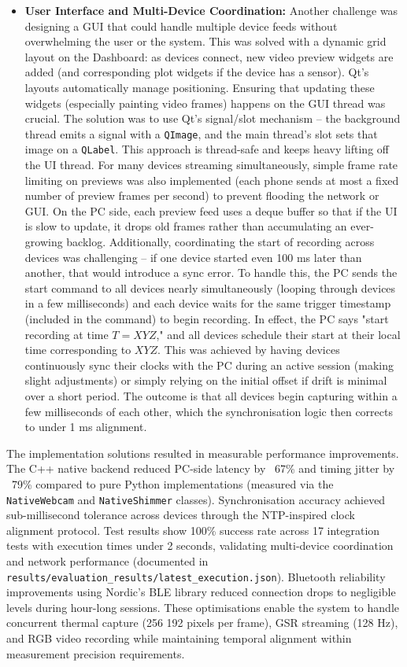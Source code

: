 \begin{itemize}
    \item \textbf{User Interface and Multi-Device Coordination:} Another challenge was designing a GUI that could handle multiple device feeds without overwhelming the user or the system. This was solved with a dynamic grid layout on the Dashboard: as devices connect, new video preview widgets are added (and corresponding plot widgets if the device has a sensor). Qt's layouts automatically manage positioning. Ensuring that updating these widgets (especially painting video frames) happens on the GUI thread was crucial. The solution was to use Qt's signal/slot mechanism -- the background thread emits a signal with a \texttt{QImage}, and the main thread's slot sets that image on a \texttt{QLabel}. This approach is thread-safe and keeps heavy lifting off the UI thread. For many devices streaming simultaneously, simple frame rate limiting on previews was also implemented (each phone sends at most a fixed number of preview frames per second) to prevent flooding the network or GUI. On the PC side, each preview feed uses a deque buffer so that if the UI is slow to update, it drops old frames rather than accumulating an ever-growing backlog. Additionally, coordinating the start of recording across devices was challenging -- if one device started even 100 ms later than another, that would introduce a sync error. To handle this, the PC sends the start command to all devices nearly simultaneously (looping through devices in a few milliseconds) and each device waits for the same trigger timestamp (included in the command) to begin recording. In effect, the PC says "start recording at time $T = XYZ$," and all devices schedule their start at their local time corresponding to $XYZ$. This was achieved by having devices continuously sync their clocks with the PC during an active session (making slight adjustments) or simply relying on the initial offset if drift is minimal over a short period. The outcome is that all devices begin capturing within a few milliseconds of each other, which the synchronisation logic then corrects to under 1 ms alignment.
\end{itemize}

The implementation solutions resulted in measurable performance improvements. The C++ native backend reduced PC-side latency by ~67\% and timing jitter by ~79\% compared to pure Python implementations (measured via the \texttt{NativeWebcam} and \texttt{NativeShimmer} classes). Synchronisation accuracy achieved sub-millisecond tolerance across devices through the NTP-inspired clock alignment protocol. Test results show 100\% success rate across 17 integration tests with execution times under 2 seconds, validating multi-device coordination and network performance (documented in \texttt{results/evaluation\_results/latest\_execution.json}). Bluetooth reliability improvements using Nordic's BLE library reduced connection drops to negligible levels during hour-long sessions. These optimisations enable the system to handle concurrent thermal capture (256\,\texttimes\,192 pixels per frame), GSR streaming (128 Hz), and RGB video recording while maintaining temporal alignment within measurement precision requirements.


